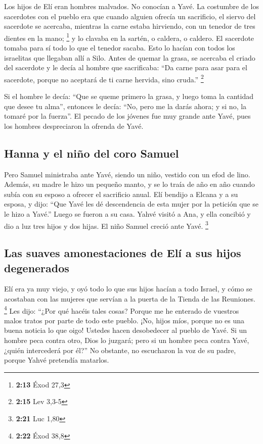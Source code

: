  Los hijos de Elí eran hombres malvados. No conocían a
Yavé.  La costumbre de los sacerdotes con el pueblo era
que cuando alguien ofrecía un sacrificio, el siervo del sacerdote se
acercaba, mientras la carne estaba hirviendo, con un tenedor de tres
dientes en la mano; \footnote{\textbf{2:13} Éxod 27,3}  y
lo clavaba en la sartén, o caldera, o caldero. El sacerdote tomaba para
sí todo lo que el tenedor sacaba. Esto lo hacían con todos los
israelitas que llegaban allí a Silo.  Antes de quemar la
grasa, se acercaba el criado del sacerdote y le decía al hombre que
sacrificaba: ``Da carne para asar para el sacerdote, porque no aceptará
de ti carne hervida, sino cruda.'' \footnote{\textbf{2:15} Lev 3,3-5}

 Si el hombre le decía: ``Que se queme primero la grasa,
y luego toma la cantidad que desee tu alma'', entonces le decía: ``No,
pero me la darás ahora; y si no, la tomaré por la fuerza''.
 El pecado de los jóvenes fue muy grande ante Yavé, pues
los hombres despreciaron la ofrenda de Yavé.

\hypertarget{hanna-y-el-niuxf1o-del-coro-samuel}{%
\subsection{Hanna y el niño del coro
Samuel}\label{hanna-y-el-niuxf1o-del-coro-samuel}}

 Pero Samuel ministraba ante Yavé, siendo un niño,
vestido con un efod de lino.  Además, su madre le hizo un
pequeño manto, y se lo traía de año en año cuando subía con su esposo a
ofrecer el sacrificio anual.  Elí bendijo a Elcana y a su
esposa, y dijo: ``Que Yavé les dé descendencia de esta mujer por la
petición que se le hizo a Yavé.'' Luego se fueron a su casa.
 Yahvé visitó a Ana, y ella concibió y dio a luz tres
hijos y dos hijas. El niño Samuel creció ante Yavé. \footnote{\textbf{2:21}
  Luc 1,80}

\hypertarget{las-suaves-amonestaciones-de-eluxed-a-sus-hijos-degenerados}{%
\subsection{Las suaves amonestaciones de Elí a sus hijos
degenerados}\label{las-suaves-amonestaciones-de-eluxed-a-sus-hijos-degenerados}}

 Elí era ya muy viejo, y oyó todo lo que sus hijos hacían
a todo Israel, y cómo se acostaban con las mujeres que servían a la
puerta de la Tienda de las Reuniones. \footnote{\textbf{2:22} Éxod 38,8}
 Les dijo: ``¿Por qué hacéis tales cosas? Porque me he
enterado de vuestros malos tratos por parte de todo este pueblo.
 ¡No, hijos míos, porque no es una buena noticia lo que
oigo! Ustedes hacen desobedecer al pueblo de Yavé.  Si un
hombre peca contra otro, Dios lo juzgará; pero si un hombre peca contra
Yavé, ¿quién intercederá por él?'' No obstante, no escucharon la voz de
su padre, porque Yahvé pretendía matarlos.

